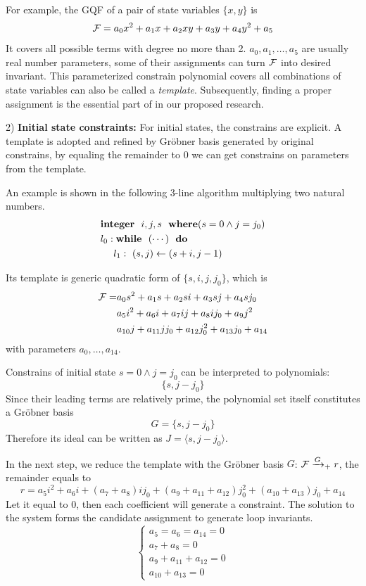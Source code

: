 For example, the GQF of a pair of state variables $\{x,y\}$ is
$${\mathcal{F}} = a_0x^2+a_1x+a_2xy+a_3y+a_4y^2+a_5$$
It covers all possible terms with degree no more than 2. $a_0,a_1,\dots, a_5$ are usually real number parameters,
some of their assignments can turn ${\mathcal{F}}$ into desired invariant. This parameterized constrain
polynomial covers all combinations of state variables can also be called a \emph{template}.
Subsequently, finding a proper assignment is the essential part of in our proposed research.

2) {\bf Initial state constraints:} For initial states, the constrains are explicit. A template is adopted and refined by Gr\"obner basis 
generated by original constrains, by equaling the remainder to 0 we can get constrains on
parameters from the template.

An example is shown in the following 3-line algorithm multiplying two natural numbers. 
\begin{align}
\label{eqn:loopinv}
& {\bf integer}~~i,j,s~~{\bf where}(s=0 \land j=j_0) \nonumber\\
& l_0: {\bf while}~~(\cdots)~~{\bf do} \nonumber\\
& ~~~~ l_1:~(s,j)\gets(s+i,j-1) 
\end{align}

Its template is generic quadratic form of $\{s,i,j,j_0\}$, which is
\begin{align}
{\mathcal{F}} = & a_0s^2+a_1s+a_2si+a_3sj+a_4sj_0\nonumber\\
&a_5i^2+a_6i+a_7ij+a_8ij_0+a_9j^2\nonumber\\
&a_{10}j+a_{11}jj_0+a_{12}j_0^2+a_{13}j_0+a_{14}\nonumber
\end{align}
with parameters $a_0,\dots,a_{14}$.

Constrains of initial state $s=0\land j=j_0$ can be interpreted to polynomials:
$$\{s, j-j_0\}$$
Since their leading terms are relatively prime, the polynomial set itself constitutes a Gr\"obner basis 
$$G=\{s, j-j_0\}$$ 
Therefore its ideal can be written as
$J=\langle s,j-j_0\rangle$.

In the next step, we reduce the template with the Gr\"obner basis $G$: ${\mathcal{F}} \xrightarrow{G}_+ r$, the remainder equals to
$$r = a_5i^2+a_6i+(a_7+a_8)ij_0+(a_9+a_{11}+a_{12})j_0^2+(a_{10}+a_{13})j_0+a_{14}$$
Let it equal to 0, then each coefficient will generate a constraint. The solution to the system forms the candidate
assignment to generate loop invariants.
\begin{equation}
\left\{
\begin{array}{l}
a_5=a_6=a_{14}=0\\
a_7+a_8=0\\
a_9+a_{11}+a_{12}=0\\
a_{10}+a_{13}=0
\end{array}\right.
\nonumber
\end{equation}

